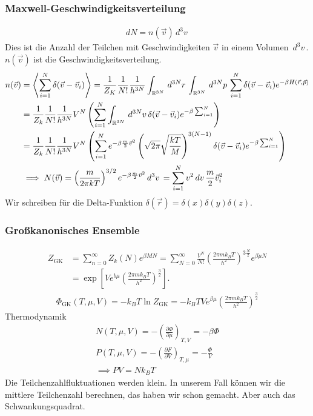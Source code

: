 \documentclass[11pt]{article}
\theoremstyle{plain}
\theoremstyle{mytheoremstyle}
\newcommand{\R}{\mathbb{R}}
\newcommand{\pd}[2]{\frac{\partial #1 }{\partial #2}}
\newcommand{\GK}{\text{GK}}
\renewcommand{\d}[1]{\,d#1\,}
\begin{document}
\subsubsection*{Maxwell-Geschwindigkeitsverteilung}
%
\begin{align*}
  dN = n(\vec{v}) \d{^3 v}
\end{align*}
%
Dies ist die Anzahl der Teilchen mit Geschwindigkeiten $\vec{v}$
in einem Volumen $ \d{^3v }$.
$n(\vec{v})$ ist die Geschwindigkeitsverteilung.
%
\begin{align*}
  n(\vec{v}) & = \Braket{ \sum_{i=1}^{ N } \delta(\vec{v} - \vec{v}_i)} 
              = \frac{1}{Z_K} \frac{1}{N!} \frac{1}{h^{3N}} 
  \int_{\R^{3N}}^{} \d{^{3N}r}\int_{\R^{3N}}^{} \d{^{3N} p }
  \sum_{i=1}^{N} \delta(\vec{v} - \vec{v}_i) e^{-\beta H (\vec{r}, \vec{p})} \\
  & = \frac{1}{Z_k} \frac{1}{N!} \frac{1}{h^{3N}} V^N 
  \left( 
    \sum_{i=1}^{N} \int_{\R^{3N}}^{} \d{^{3N}v}
    \delta (\vec{v} - \vec{v}_i) e^{-\beta \sum_{i=1}^{N}  }
    \right) \\
  & = \frac{1}{Z_k} \frac{1}{N!} \frac{1}{h^{3N}} V^N
  \left(   \sum_{i=1}^{N} e^{-\beta \frac{m}{2} \vec{v}^2}
    \left( \sqrt{2 \pi} \sqrt{\frac{kT}{M}} \right)^{3(N-1)}
    \delta (\vec{v} - \vec{v}_i) e ^{-\beta \sum_{i=1}^{N}} \right) \\
     & \implies N(\vec{v})  = \left( \frac{m}{2 \pi k T} \right) ^{3/2}
      e^{-\beta \frac{m}{2} \vec{v}^2}
      \d{^3 v}  = \sum_{i=1}^{N} v^2 \d{v}
  \frac{m}{2} \vec{v}_i^2 
\end{align*}
%
Wir schreiben f\"ur die Delta-Funktion $\delta(\vec{r}) = \delta(x) \delta(y)
\delta(z)$.

\subsubsection*{Gro\ss{}kanonisches Ensemble}
%
\begin{align*}
  Z_{\GK} & = \sum_{n=0}^{\infty} Z_k (N) e^{ \beta M N} = 
  \sum_{N=0}^{\infty} \frac{V^N}{N!} \left( \frac{2 \pi m k_B T}{h^2} \right) 
  ^{3 \frac{N}{2}} e^{\beta \mu N} \\
& = \exp\left[ V e^{b \mu} \left(  \frac{2 \pi m k_B T}{ h^2} \right)^{\frac{3}{2}} \right].
\end{align*}
%
%
\begin{align*}
  \Phi_{\GK} (T, \mu, V) = -k_B T \ln{Z_\GK} = -k_B T V e^{\beta \mu}
  \left( \frac{2 \pi m k_B T}{ h^2} \right)^{\frac{3}{2}}
\end{align*}
%
Thermodynamik
%
\begin{align*}
  N(T, \mu, V) = - \left( \pd{\Phi}{\mu} \right)_{T,V} = 
  - \beta \Phi \\
  P(T, \mu, V) = - \left( \pd{F}{V} \right)_{T, \mu} = 
  - \frac{\Phi}{V} \\
  \implies PV = N k_B T 
\end{align*}
%
Die Teilchenzahlfluktuationen werden klein. In unserem Fall k\"onnen
wir die mittlere Teilchenzahl berechnen, das haben wir schon gemacht.
Aber auch das Schwankungsquadrat.
\end{document}
